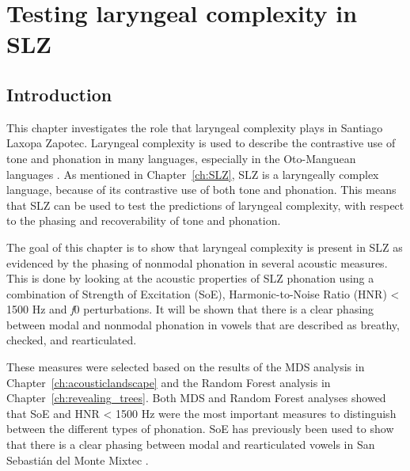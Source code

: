 \chapter{Testing laryngeal complexity in SLZ} \label{ch:testing_lc}

\section{Introduction}\label{sec:introduction_of_lc}

This chapter investigates the role that laryngeal complexity plays in Santiago Laxopa Zapotec. Laryngeal complexity is used to describe the contrastive use of tone and phonation in many languages, especially in the Oto-Manguean languages \citep{blankenshipTimeCourseBreathiness1997,blankenshipTimingNonmodalPhonation2002,silvermanLaryngealComplexityOtomanguean1997,silvermanPhasingRecoverability1997}. As mentioned in Chapter~\ref{ch:SLZ}, SLZ is a laryngeally complex language, because of its contrastive use of both tone and phonation. This means that SLZ can be used to test the predictions of laryngeal complexity, with respect to the phasing and recoverability of tone and phonation.

The goal of this chapter is to show that laryngeal complexity is present in SLZ as evidenced by the phasing of nonmodal phonation in several acoustic measures. This is done by looking at the acoustic properties of SLZ phonation using a combination of Strength of Excitation (SoE), Harmonic-to-Noise Ratio (HNR) < 1500 Hz and \textit{f}0 perturbations. It will be shown that there is a clear phasing between modal and nonmodal phonation in vowels that are described as breathy, checked, and rearticulated. 

These measures were selected based on the results of the MDS analysis in Chapter~\ref{ch:acousticlandscape} and the Random Forest analysis in Chapter~\ref{ch:revealing_trees}. Both MDS and Random Forest analyses showed that SoE and HNR < 1500 Hz were the most important measures to distinguish between the different types of phonation. SoE has previously been used to show that there is a clear phasing between modal and rearticulated vowels in San Sebastián del Monte Mixtec \citep{wellerInteractionsToneGlottalization2023,wellerLexicalToneVowel2023,wellerVoiceQualityTone2024}. 

